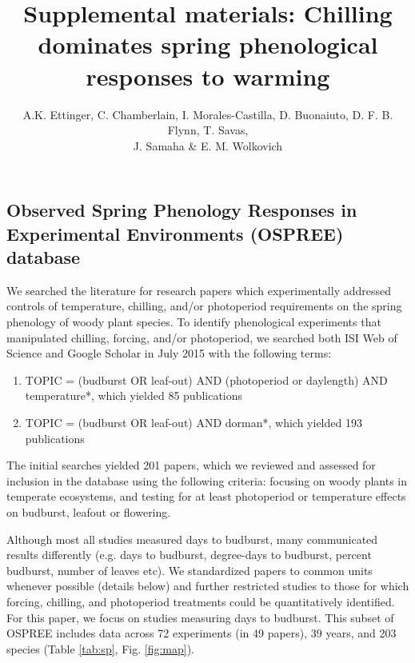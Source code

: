 \documentclass{article}
\begin{document}
\title{Supplemental materials:  Chilling dominates spring phenological responses to warming} 

\author{A.K. Ettinger, C. Chamberlain, I. Morales-Castilla, D. Buonaiuto, D. F. B. Flynn, T. Savas, \\J. Samaha \& E. M. Wolkovich}
\maketitle  %
\renewcommand{\thetable}{S\arabic{table}}
\renewcommand{\thefigure}{S\arabic{figure}}

\subsection*{Observed Spring Phenology Responses in Experimental Environments (OSPREE) database}
\par We searched the literature for research papers which experimentally addressed controls of temperature, chilling, and/or photoperiod requirements on the spring phenology of woody plant species. To identify phenological experiments that manipulated chilling, forcing, and/or photoperiod, we searched both ISI Web of Science and Google Scholar in July 2015 with the following terms: 
\begin{enumerate}
\item TOPIC = (budburst OR leaf-out) AND (photoperiod or daylength) AND temperature*, which yielded 85 publications

\item TOPIC = (budburst OR leaf-out) AND dorman*, which yielded 193 publications
\end{enumerate}



The initial searches yielded 201 papers, which we reviewed and assessed for inclusion in the database using the following criteria: focusing on woody plants in temperate ecosystems, and testing for at least photoperiod or temperature effects on budburst, leafout or 
flowering. 
\par Although most all studies measured days to budburst, many communicated results differently (e.g. days to budburst, degree-days to budburst, percent budburst, number of leaves etc). We standardized papers to common units whenever possible (details below) and further restricted studies to those for which forcing, chilling, and photoperiod treatments could be quantitatively identified. For this paper, we focus on studies measuring days to budburst. This subset of OSPREE includes data across 72 experiments (in 49 papers), 39 years, and 203 species (Table \ref{tab:sp}, Fig. \ref{fig:map}).
\end{document}
